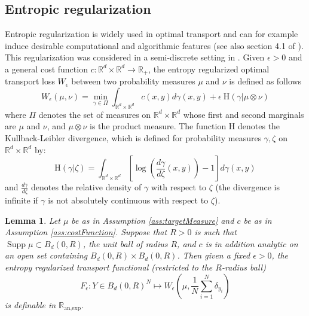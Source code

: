 \documentclass[11pt]{article}
\DeclareMathOperator{\supp}{Supp}
\newcommand{\R}{\mathbb R}
\newcommand{\1}{\mathbbm{1}}
\newtheorem{lem}{Lemma}[section]
\numberwithin{equation}{section}
\begin{document}
\subsection{Entropic regularization}
\label{sec:entropy}

Entropic regularization is widely used in optimal transport and can for example induce desirable computational and algorithmic features \cite{cuturi2013sinkhorn} (see also section 4.1 of \cite{peyre2019computational}).
This regularization was considered in a semi-discrete setting in \cite[Section 2]{Entropic}.
Given $\epsilon>0$ and a general cost function $c \colon \R^d \times\R^d \to \R_+$, the entropy regularized optimal transport loss $W_{\epsilon}$ between two probability measures $\mu$ and $\nu $ is defined as follows 
\begin{equation}\label{entropic_wass}
    W_{\epsilon}(\mu,\nu)=\underset{\gamma \in \Pi}{\min}\int_{\R^d\times \R^d}c(x,y)d\gamma(x,y)+\epsilon\: \text{H}(\gamma\vert\mu \otimes \nu)
\end{equation}
where $\Pi$ denotes the set of measures on $\R^d \times \R^d$ whose first and second marginals are $\mu$ and $\nu$, and $\mu \otimes \nu$ is the product measure. The function H denotes the Kullback-Leibler divergence, which is defined for probability measures $\gamma, \zeta$ on $\R^d \times \R^d$ by: 
\begin{equation*}
    \text{H}(\gamma\vert\zeta)=\int_{\R^d\times \R^d}\left[\log\left(\frac{d\gamma}{d\zeta}(x,y)\right)-1 \right]d\gamma(x,y)
\end{equation*}
and $\frac{d\gamma}{d\zeta}$ denotes the relative density of $\gamma$ with respect to $\zeta$ (the divergence is infinite if $\gamma$ is not absolutely continuous with respect to $\zeta$). 

\begin{lem}
	\label{lem:entropic}
	Let $\mu$ be as in Assumption \ref{ass:targetMeasure} and $c$ be as in Assumption \ref{ass:costFunction}. Suppose that $R>0$ is such that $\supp \mu \subset B_{d}(0,R)$, the unit ball of radius $R$, and $c$ is in addition analytic on an open set containing $B_{d}(0,R)\times B_{d}(0,R)$. 
	Then given a fixed $\epsilon > 0$, the entropy regularized transport functional (restricted to the $R$-radius ball)
	\begin{equation}
	F_{\epsilon}: Y\in B_{d}(0,R)^{N}\longmapsto W_{\epsilon}\left(\mu,\frac{1}{N}\sum_{i=1}^{N}\delta_{y_{i}}\right)
	\end{equation}
 is definable in $\mathbb{R}_{\text{an,exp}}$.
\end{lem}
\end{document}
